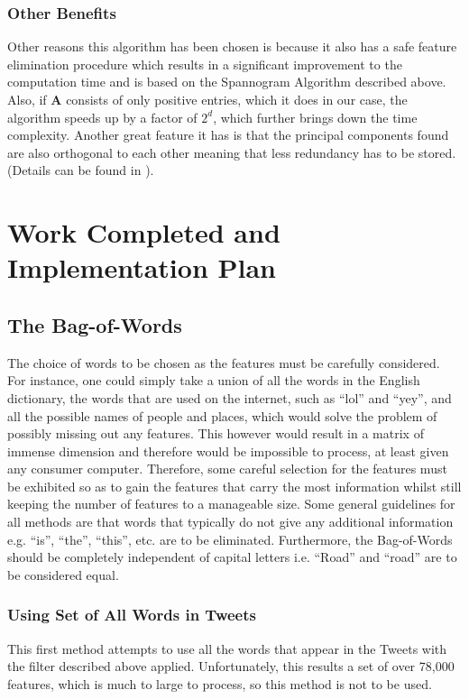 \documentclass[11pt,a4paper]{article}
\begin{document}
\subsubsection{Other Benefits}
Other reasons this algorithm has been chosen is because it also has a safe feature elimination procedure which results in a significant improvement to the computation time and is based on the Spannogram Algorithm described above. Also, if $\mathbf{A}$ consists of only positive entries, which it does in our case, the algorithm speeds up by a factor of $2^d$, which further brings down the time complexity. Another great feature it has is that the principal components found are also orthogonal to each other meaning that less redundancy has to be stored. (Details can be found in \cite{dimakis}).
\section{Work Completed and Implementation Plan}

\subsection{The Bag-of-Words}
The choice of words to be chosen as the features must be carefully considered. For instance, one could simply take a union of all the words in the English dictionary, the words that are used on the internet, such as ``lol'' and ``yey'', and all the possible names of people and places, which would solve the problem of possibly missing out any features. This however would result in a matrix of immense dimension and therefore would be impossible to process, at least given any consumer computer. Therefore, some careful selection for the features must be exhibited so as to gain the features that carry the most information whilst still keeping the number of features to a manageable size. Some general guidelines for all methods are that words that typically do not give any additional information e.g. ``is'', ``the'', ``this'', etc. are to be eliminated. Furthermore, the Bag-of-Words should be completely independent of capital letters i.e. ``Road'' and ``road'' are to be considered equal. 

\subsubsection{Using Set of All Words in Tweets}
This first method attempts to use all the words that appear in the Tweets with the filter described above applied. Unfortunately, this results a set of over 78,000 features, which is much to large to process, so this method is not to be used. 
\end{document}
